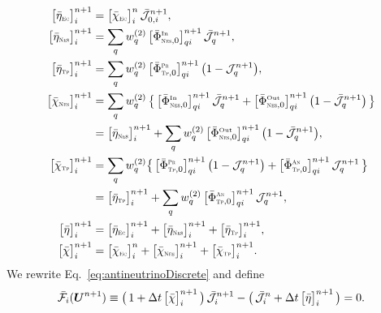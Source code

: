 \documentclass[12pt]{article}
\newcommand{\EC}{\mbox{\tiny{\sc Ec}}}
\newcommand{\NES}{\mbox{\tiny{\sc Nes}}} %
\newcommand{\PROD}{\mbox{\tiny{\sc Pr}}}
\newcommand{\ANN}{\mbox{\tiny{\sc An}}}
\newcommand{\TP}{\mbox{\tiny{\sc Tp}}}      %
\begin{document}
\begin{align}
  \big[\bar{\eta}_{\EC}\big]_{i}^{n+1}
  &=\big[\bar{\chi}_{\EC}\big]_{i}^{n}\,\bar{\mathcal{J}}_{0,i}^{n+1}, \label{eq:ECemissivityAntineutrino} \\
  \big[\bar{\eta}_{\NES}\big]_{i}^{n+1}
  &=\sum_{q}w_{q}^{(2)}\,\big[\bar{\Phi}_{\NES,0}^{\In}\big]_{qi}^{n+1}\,\bar{\mathcal{J}}_{q}^{n+1}, \label{eq:NESemissivityAntineutrino} \\
  \big[\bar{\eta}_{\TP}\big]_{i}^{n+1}
  &=\sum_{q}w_{q}^{(2)}\,\big[\bar{\Phi}_{\TP,0}^{\PROD}\big]_{qi}^{n+1}\,\big(1-\mathcal{J}_{q}^{n+1}\big), \label{eq:PAIRemissivityAntineutrino} \\
  \big[\bar{\chi}_{\NES}\big]_{i}^{n+1}
  &=\sum_{q}w_{q}^{(2)}\,\big\{\,\big[\bar{\Phi}_{\NES,0}^{\In}\big]_{qi}^{n+1}\,\bar{\mathcal{J}}_{q}^{n+1}+\big[\bar{\Phi}_{\NES,0}^{\Out}\big]_{qi}^{n+1}\,\big(1-\bar{\mathcal{J}}_{q}^{n+1}\big)\,\big\} \\
  &=\big[\bar{\eta}_{\NES}\big]_{i}^{n+1}+\sum_{q}w_{q}^{(2)}\,\big[\bar{\Phi}_{\NES,0}^{\Out}\big]_{qi}^{n+1}\,\big(1-\bar{\mathcal{J}}_{q}^{n+1}\big), \label{eq:NESopacityAntineutrino} \\
  \big[\bar{\chi}_{\TP}\big]_{i}^{n+1}
  &=\sum_{q}w_{q}^{(2)}\big\{\,\big[\bar{\Phi}_{\TP,0}^{\PROD}\big]_{qi}^{n+1}\,\big(1-\mathcal{J}_{q}^{n+1}\big)+\big[\bar{\Phi}_{\TP,0}^{\ANN}\big]_{qi}^{n+1}\,\mathcal{J}_{q}^{n+1}\,\big\} \\
  &=\big[\bar{\eta}_{\TP}\big]_{i}^{n+1}+\sum_{q}w_{q}^{(2)}\,\big[\bar{\Phi}_{\TP,0}^{\ANN}\big]_{qi}^{n+1}\,\mathcal{J}_{q}^{n+1}, \label{eq:PAIRopacityAntineutrino} \\
  \big[\bar{\eta}\big]_{i}^{n+1}
  &=\big[\bar{\eta}_{\EC}\big]_{i}^{n+1}+\big[\bar{\eta}_{\NES}\big]_{i}^{n+1}+\big[\bar{\eta}_{\TP}\big]_{i}^{n+1}, \label{eq:TOTALemissivityAntineutrino} \\
  \big[\bar{\chi}\big]_{i}^{n+1}
  &=\big[\bar{\chi}_{\EC}\big]_{i}^{n}+\big[\bar{\chi}_{\NES}\big]_{i}^{n+1}+\big[\bar{\chi}_{\TP}\big]_{i}^{n+1}. \label{eq:TOTALopacityAntineutrino}
\end{align}
We rewrite Eq.~\eqref{eq:antineutrinoDiscrete} and define
\begin{equation}
  \bar{\mathcal{F}}_{i}(\boldsymbol{U}^{n+1})\equiv
  \big(\,1+\Delta t\,\big[\bar{\chi}\big]_{i}^{n+1}\,\big)\,\bar{\mathcal{J}}_{i}^{n+1}-\big(\,\bar{\mathcal{J}}_{i}^{n}+\Delta t\,\big[\bar{\eta}\big]_{i}^{n+1}\,\big)=0.
  \label{eq:antineutrinoDiscreteResidualForm}
\end{equation}
\end{document}
